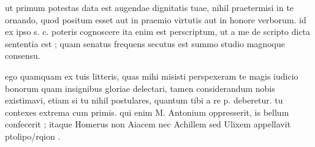 


 ut primum potestas data est augendae dignitatis tuae, nihil praetermisi in te ornando, quod positum esset aut in praemio virtutis aut in honore verborum. id ex ipso s. c. poteris cognoscere ita enim est perscriptum, ut a me de scripto dicta sententia est ; quam senatus frequens secutus est summo studio magnoque consensu.

 ego quamquam ex tuis litteris, quas mihi misisti perspexeram te magis iudicio bonorum quam insignibus gloriae delectari, tamen considerandum nobis existimavi, etiam si tu nihil postulares, quantum tibi a re p. deberetur. tu contexes extrema cum primis. qui enim M. Antonium oppresserit, is bellum confecerit ; itaque Homerus non Aiacem nec Achillem sed Ulixem appellavit ptolipo/rqion .
